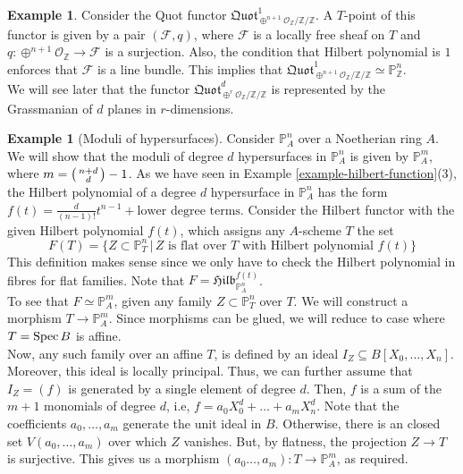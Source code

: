\documentclass[11pt]{amsart}
\newcommand{\Spec}{{\rm Spec \,}}
\newcommand{\sF}{{\mathcal F}}
\newcommand{\sO}{{\mathcal O}}
\renewcommand{\P}{{\mathbb P}}
\newcommand{\Z}{{\mathbb Z}}
\theoremstyle{definition}
\newtheorem{example}[theorem]{Example}
\begin{document}
\begin{example}
	\label{example-projective-space-as-quot}
	Consider the Quot functor $\mathfrak{Quot}^1_{\oplus^{n+1}\sO_\Z/\Z/\Z}$. A $T$-point of this functor is given by a pair $(\sF,q)$, where $\sF$ is a locally free sheaf on $T$ and $q: \oplus^{n+1}\sO_\Z\rightarrow \sF$ is a surjection. Also, the condition that Hilbert polynomial is $1$ enforces that $\sF$ is a line bundle. This implies that $\mathfrak{Quot}^1_{\oplus^{n+1}\sO_\Z/\Z/\Z} \simeq \P^n_\Z$.\\
	We will see later that the functor $\mathfrak{Quot}^d_{\oplus^{r}\sO_\Z/\Z/\Z}$ is represented by the Grassmanian of $d$ planes in $r$-dimensions.
\end{example}

\begin{example}[Moduli of hypersurfaces]
	Consider $\P^n_A$ over a Noetherian ring $A$. We will show that the moduli of degree $d$ hypersurfaces in $\P^n_A$ is given by $\P^m_A$, where 
	$m = \begin{psmallmatrix}
	n + d\\
	d
	\end{psmallmatrix} -1$. As we have seen in Example \ref{example-hilbert-function}(3), the Hilbert polynomial of a degree $d$ hypersurface in $\P^n_A$ has the form $f(t)=\frac{d}{(n-1)!}t^{n-1}+\text{lower degree terms}$. Consider the Hilbert functor with the given Hilbert polynomial $f(t)$, which assigns any $A$-scheme $T$ the set
	\begin{equation*}
	F(T)=\{ Z\subset \P^n_T \, | \, \text{$Z$ is flat over $T$ with Hilbert polynomial $f(t)$}\}
	\end{equation*}
	This definition makes sense since we only have to check the Hilbert polynomial in fibres for flat families. Note that $F=\mathfrak{Hilb}^{f(t)}_{\P^n_A}$.\\
	To see that $F\simeq \P^m_A$, given any family $Z\subset \P^n_T$ over $T$. We will construct a morphism $T\rightarrow\P^m_A$. Since morphisms can be glued, we will reduce to case where $T=\Spec B$ is affine.\\
	Now, any such family over an affine $T$, is defined by an ideal $I_Z\subseteq B[X_0,\ldots,X_n]$. Moreover, this ideal is locally principal. Thus, we can further assume that $I_Z = (f)$ is generated by a single element of degree $d$. Then, $f$ is a sum of the $m+1$ monomials of degree $d$, i.e, $f=a_0 X^d_0+\ldots+a_m X^d_n$. Note that the coefficients $a_0,\ldots,a_m$ generate the unit ideal in $B$. Otherwise, there is an closed set $V(a_0,\ldots,a_m)$ over which $Z$ vanishes. But, by flatness, the projection $Z\rightarrow T$ is surjective. This gives us a morphism $(a_0\ldots,a_m): T\rightarrow \P^m_A$, as required.\\

\end{example}
\end{document}
